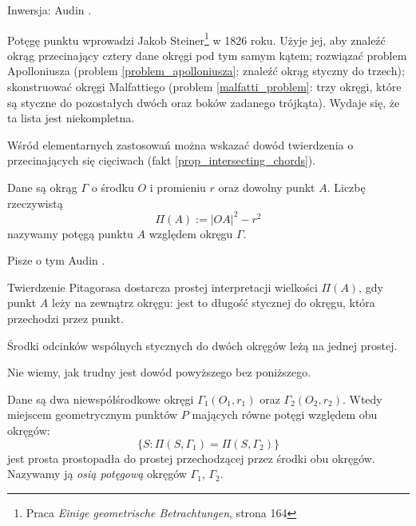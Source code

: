 
Inwersja: Audin \cite[s. 84]{audin_2003}.


Potęgę punktu wprowadzi Jakob Steiner\footnote{Praca \emph{Einige geometrische Betrachtungen}, strona 164} w 1826 roku.
%
Użyje jej, aby znaleźć okrąg przecinający cztery dane okręgi pod tym samym kątem; rozwiązać problem Apolloniusza (problem \ref{problem_apolloniusza}: znaleźć okrąg styczny do trzech); skonstruować okręgi Malfattiego (problem \ref{malfatti_problem}: trzy okręgi, które są styczne do pozostałych dwóch oraz boków zadanego trójkąta).
%
%
Wydaje się, że ta lista jest niekompletna.

Wśród elementarnych zastosowań można wskazać dowód twierdzenia o przecinających się cięciwach (fakt \ref{prop_intersecting_chords}).

\begin{definition}
	\label{def_power_point}
	Dane są okrąg $\Gamma$ o środku $O$ i promieniu $r$ oraz dowolny punkt $A$.
	Liczbę rzeczywistą
	\begin{equation}
		\Pi(A) := |OA|^2 - r^2
	\end{equation}
	nazywamy potęgą punktu $A$ względem okręgu $\Gamma$.
\end{definition}

Pisze o tym Audin \cite[s. 89]{audin_2003}.

Twierdzenie Pitagorasa dostarcza prostej interpretacji wielkości $\Pi(A)$, gdy punkt $A$ leży na zewnątrz okręgu: jest to długość stycznej do okręgu, która przechodzi przez punkt.

\begin{proposition}
	Środki odcinków wspólnych stycznych do dwóch okręgów leżą na jednej prostej. %
\end{proposition}

Nie wiemy, jak trudny jest dowód powyższego bez poniższego.

\begin{proposition}
\label{guzicki_6_11}%
    Dane są dwa niewspółśrodkowe okręgi $\Gamma_1(O_1, r_1)$ oraz $\Gamma_2(O_2, r_2)$.
    Wtedy miejscem geometrycznym punktów $P$ mających równe potęgi względem obu okręgów:
	\begin{equation}
		\{S : \Pi(S, \Gamma_1) = \Pi(S, \Gamma_2)\}
	\end{equation}
	jest prosta prostopadła do prostej przechodzącej przez środki obu okręgów.
	Nazywamy ją \emph{osią potęgową} okręgów $\Gamma_1$, $\Gamma_2$.
\end{proposition}

